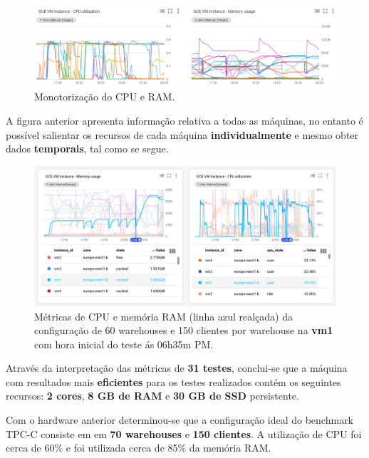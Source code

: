 \begin{figure}[H]
    \centering
    \includegraphics[scale=0.65]{imagens/charts_usage.PNG}
    \caption{Monotorização do CPU e RAM.}
    \label{fig:confRef}
\end{figure}

\hspace{5mm} A figura anterior apresenta informação relativa a todas as máquinas, no entanto é possível salientar os recursos de cada máquina \textbf{individualmente} e mesmo obter dados \textbf{temporais}, tal como se segue.

\begin{figure}[H]
    \centering
    \includegraphics[scale=0.4]{imagens/60w-150c.png}
    \caption{Métricas de CPU e memória RAM (linha azul realçada) da configuração de 60 warehouses e 150 clientes por warehouse na \textbf{vm1} com hora inicial do teste ás 06h35m PM.}
    \label{fig:confRef}
\end{figure}

\hspace{5mm} Através da interpretação das métricas de \textbf{31 testes}, conclui-se que a máquina com resultados mais \textbf{eficientes} para os testes realizados contém os seguintes recursos: \textbf{2 cores}, \textbf{8 GB de RAM} e \textbf{30 GB de SSD} persistente.

\hspace{5mm} Com o hardware anterior determinou-se que a configuração ideal do benchmark TPC-C consiste em em \textbf{70 warehouses} e \textbf{150 clientes}. A utilização de CPU foi cerca de 60\% e foi utilizada cerca de 85\% da memória RAM.

